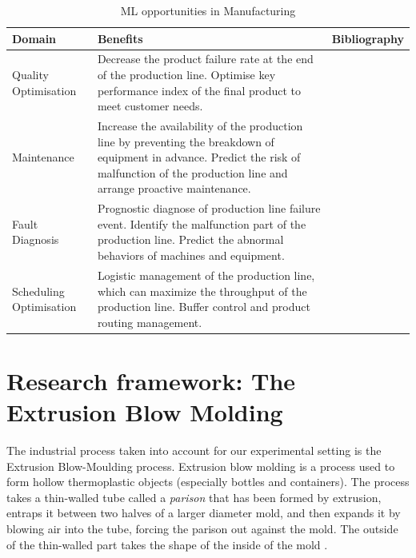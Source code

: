 \begin{table}
\label{tab:ai_benefits}
\begin{tabular}{|l|p{6cm}|p{4cm}|}
\hline
%
Domain &
  Benefits &
    Bibliography \\ \hline
Quality Optimisation &
  Decrease the product failure rate at the end of the production line. Optimise key performance index of the final product to meet customer needs. &
    \citep{lieber2013quality, li2018ensemble, chen2008neural, nagorny2017quality, haeussler1996quality} \\ \hline

Maintenance &
  Increase the availability of the production line by preventing the breakdown of equipment in advance. Predict the risk of malfunction of the production line and arrange proactive maintenance. &
    \citep{nguyen2019new, lee2017application, einabadi2019dynamic, li2017intelligent, liu2016prediction}\\ \hline
Fault Diagnosis &
  Prognostic diagnose of production line failure event. Identify the malfunction part of the production line. Predict the abnormal behaviors of machines and equipment. & \citep{toma2020bearing, wong2006modified, chen2014fault, malik2017artificial, arabaci2010automatic} \\ \hline
Scheduling Optimisation &
  Logistic management of the production line, which can maximize the throughput of the production line. Buffer control and product routing management. & \citep{morariu2020machine, woschank2020review, lolli2019machine, zhang2019review, gomes2016developing} \\ \hline
\end{tabular}
\caption{ML opportunities in Manufacturing}
\end{table}


\section{Research framework: The Extrusion Blow Molding} \label{Research framework: The Extrusion Blow Molding}

The industrial process taken into account for our experimental setting is the Extrusion Blow-Moulding process. Extrusion blow molding is a process used to form hollow thermoplastic objects (especially bottles and containers). The process takes a thin-walled tube called a \textit{parison} that has been formed by extrusion, entraps it between two halves of a larger diameter mold, and then expands it by blowing air into the tube, forcing the parison out against the mold. The outside of the thin-walled part takes the shape of the inside of the mold \citep{poli2001design}.

